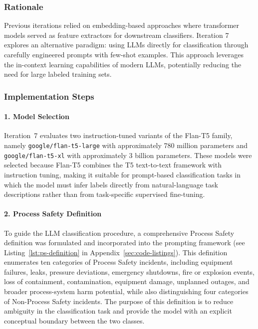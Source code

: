 \documentclass[11pt, titlepage, bibliography=totoc]{scrreprt}
\begin{document}
\subsubsection{Rationale}
Previous iterations relied on embedding-based approaches where transformer models served as feature extractors for downstream classifiers. Iteration 7 explores an alternative paradigm: using LLMs directly for classification through carefully engineered prompts with few-shot examples. This approach leverages the in-context learning capabilities of modern LLMs, potentially reducing the need for large labeled training sets.

\subsubsection{Implementation Steps}

\paragraph{1. Model Selection}
Iteration~7 evaluates two instruction-tuned variants of the Flan-T5 family, namely \texttt{google/flan-t5-large} with approximately 780 million parameters and \texttt{google/flan-t5-xl} with approximately 3 billion parameters. These models were selected because Flan-T5 combines the T5 text-to-text framework with instruction tuning, making it suitable for prompt-based classification tasks in which the model must infer labels directly from natural-language task descriptions rather than from task-specific supervised fine-tuning.

\paragraph{2. Process Safety Definition}
To guide the LLM classification procedure, a comprehensive Process Safety definition was formulated and incorporated into the prompting framework (see Listing~\ref{lst:ps-definition} in Appendix~\ref{sec:code-listings}). This definition enumerates ten categories of Process Safety incidents, including equipment failures, leaks, pressure deviations, emergency shutdowns, fire or explosion events, loss of containment, contamination, equipment damage, unplanned outages, and broader process-system harm potential, while also distinguishing four categories of Non-Process Safety incidents. The purpose of this definition is to reduce ambiguity in the classification task and provide the model with an explicit conceptual boundary between the two classes.
\end{document}
